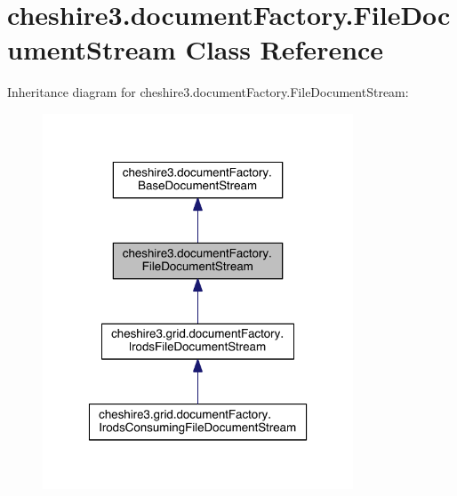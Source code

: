 \hypertarget{classcheshire3_1_1document_factory_1_1_file_document_stream}{\section{cheshire3.\-document\-Factory.\-File\-Document\-Stream Class Reference}
\label{classcheshire3_1_1document_factory_1_1_file_document_stream}
}


Inheritance diagram for cheshire3.\-document\-Factory.\-File\-Document\-Stream\-:
\nopagebreak
\begin{figure}[H]
\begin{center}
\leavevmode
\includegraphics[width=262pt]{classcheshire3_1_1document_factory_1_1_file_document_stream__inherit__graph}
\end{center}
\end{figure}


